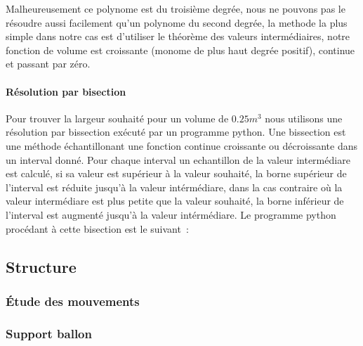 \documentclass[a4paper,11pt]{article}
\begin{document}
Malheureusement ce polynome est du troisième degrée, nous ne pouvons pas le résoudre aussi facilement qu'un polynome du second degrée, la methode la plus simple dans notre cas est d'utiliser le théorème des valeurs intermédiaires, notre fonction de volume est croissante (monome de plus haut degrée positif), continue et passant par zéro.


\paragraph{Résolution par bisection}

Pour trouver la largeur souhaité pour un volume de $0.25m^3$ nous utilisons une résolution par bissection exécuté par un programme python. Une bissection est une méthode échantillonant une fonction continue croissante ou décroissante dans un interval donné. Pour chaque interval un echantillon de la valeur intermédiare est calculé, si sa valeur est supérieur à la valeur souhaité, la borne supérieur de l'interval est réduite jusqu'à la valeur intérmédiare, dans la cas contraire où la valeur intermédiare est plus petite que la valeur souhaité, la borne inférieur de l'interval est augmenté jusqu'à la valeur intérmédiare.
\medbreak
Le programme python procédant à cette bisection est le suivant~:





\subsection{Structure}

\subsubsection{Étude des mouvements}

\subsubsection{Support ballon}
\end{document}
